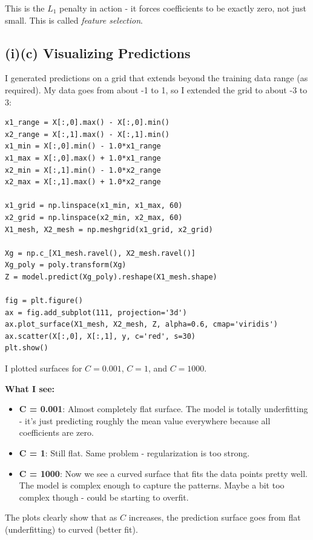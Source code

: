 \documentclass[11pt,a4paper]{article}
\begin{document}
This is the $L_1$ penalty in action - it forces coefficients to be exactly zero, not just small. This is called \textit{feature selection}.

\subsection*{(i)(c) Visualizing Predictions}

I generated predictions on a grid that extends beyond the training data range (as required). My data goes from about -1 to 1, so I extended the grid to about -3 to 3:

\begin{lstlisting}
x1_range = X[:,0].max() - X[:,0].min()
x2_range = X[:,1].max() - X[:,1].min()
x1_min = X[:,0].min() - 1.0*x1_range
x1_max = X[:,0].max() + 1.0*x1_range
x2_min = X[:,1].min() - 1.0*x2_range
x2_max = X[:,1].max() + 1.0*x2_range

x1_grid = np.linspace(x1_min, x1_max, 60)
x2_grid = np.linspace(x2_min, x2_max, 60)
X1_mesh, X2_mesh = np.meshgrid(x1_grid, x2_grid)

Xg = np.c_[X1_mesh.ravel(), X2_mesh.ravel()]
Xg_poly = poly.transform(Xg)
Z = model.predict(Xg_poly).reshape(X1_mesh.shape)

fig = plt.figure()
ax = fig.add_subplot(111, projection='3d')
ax.plot_surface(X1_mesh, X2_mesh, Z, alpha=0.6, cmap='viridis')
ax.scatter(X[:,0], X[:,1], y, c='red', s=30)
plt.show()
\end{lstlisting}

I plotted surfaces for $C = 0.001$, $C = 1$, and $C = 1000$.

\textbf{What I see:}

\begin{itemize}
    \item \textbf{C = 0.001}: Almost completely flat surface. The model is totally underfitting - it's just predicting roughly the mean value everywhere because all coefficients are zero.
    
    \item \textbf{C = 1}: Still flat. Same problem - regularization is too strong.
    
    \item \textbf{C = 1000}: Now we see a curved surface that fits the data points pretty well. The model is complex enough to capture the patterns. Maybe a bit too complex though - could be starting to overfit.
\end{itemize}

The plots clearly show that as $C$ increases, the prediction surface goes from flat (underfitting) to curved (better fit).
\end{document}
